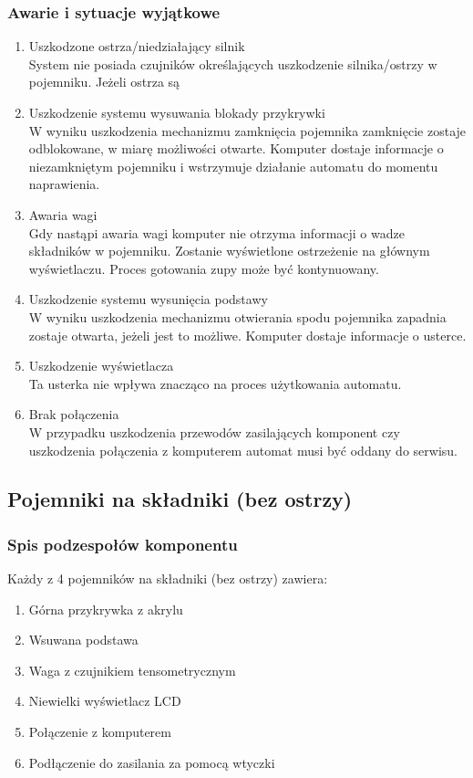 \documentclass[12pt,a4paper,notitlepage]{report}
\begin{document}
\subsubsection{Awarie i sytuacje wyjątkowe}
\begin{enumerate}
  \item Uszkodzone ostrza/niedziałający silnik\\
System nie posiada czujników określających uszkodzenie silnika/ostrzy w pojemniku. Jeżeli ostrza są 
  \item Uszkodzenie systemu wysuwania blokady przykrywki\\
W wyniku uszkodzenia mechanizmu zamknięcia pojemnika zamknięcie zostaje odblokowane, w miarę możliwości otwarte. Komputer dostaje informacje o niezamkniętym pojemniku i wstrzymuje działanie automatu do momentu naprawienia.
  \item Awaria wagi\\
Gdy nastąpi awaria wagi komputer nie otrzyma informacji o wadze składników w pojemniku. Zostanie wyświetlone ostrzeżenie na głównym wyświetlaczu. Proces gotowania zupy może być kontynuowany.
  \item Uszkodzenie systemu wysunięcia podstawy\\
W wyniku uszkodzenia mechanizmu otwierania spodu pojemnika zapadnia zostaje otwarta, jeżeli jest to możliwe. Komputer dostaje informacje o usterce.
  \item Uszkodzenie wyświetlacza\\
Ta usterka nie wpływa znacząco na proces użytkowania automatu.
  \item Brak połączenia\\
W przypadku uszkodzenia przewodów zasilających komponent czy uszkodzenia połączenia z komputerem automat musi być oddany do serwisu.
\end{enumerate}



\subsection{Pojemniki na składniki (bez ostrzy)}
\subsubsection{Spis podzespołów komponentu}
Każdy z 4 pojemników na składniki (bez ostrzy) zawiera:
\begin{enumerate}
  \item Górna przykrywka z akrylu
  \item Wsuwana podstawa
  \item Waga z czujnikiem tensometrycznym
  \item Niewielki wyświetlacz LCD
  \item Połączenie z komputerem
  \item Podłączenie do zasilania za pomocą wtyczki
\end{enumerate}
\end{document}
